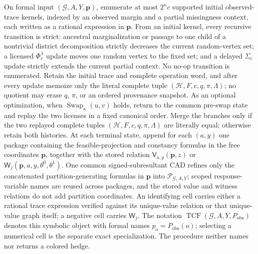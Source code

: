 On formal input \((\mathcal G,A,Y,\mathbf p)\), enumerate at most \(2^n c\) supported initial observed-trace kernels, indexed by an observed margin and a partial missingness context, each written as a rational expression in \(\mathbf p\). From an initial kernel, every recursive transition is strict: ancestral marginalization or passage to one child of a nontrivial district decomposition strictly decreases the current random-vertex set; a licensed \(\Phi_v^{\lambda}\) update moves one random vertex to the fixed set; and a delayed \(\Sigma_c\) update strictly extends the current partial context. No no-op transition is enumerated. Retain the initial trace and complete operation word, and after every update memoize only the literal complete tuple \((\mathcal H,F,c,q,\pi,\Lambda)\); no quotient may erase \(q\), \(\pi\), or an ordered provenance snapshot. As an optional optimization, when \(\operatorname{Swap}_{\kappa}(u,v)\) holds, return to the common pre-swap state and replay the two licenses in a fixed canonical order. Merge the branches only if the two replayed complete tuples \((\mathcal H,F,c,q,\pi,\Lambda)\) are literally equal; otherwise retain both histories. At each terminal state, append for each \((a,y)\) one package containing the feasible-projection and constancy formulas in the free coordinates \(\mathbf p\), together with the stored relation \(\mathsf V_{a,y}(\mathbf p,z)\) or \(\mathsf W_j(\mathbf p,a,y,\theta^0,\theta^1)\). One common signed-subresultant CAD refines only the concatenated partition-generating formulas in \(\mathbf p\) into \(\mathscr P_{\mathcal G,A,Y}\); scoped response-variable names are reused across packages, and the stored value and witness relations do not add partition coordinates. An identifying cell carries either a rational trace expression verified against its unique-value relation or that unique-value graph itself; a negative cell carries \(\mathsf W_j\). The notation \(\operatorname{TCF}(\mathcal G,A,Y,P_{\mathrm{obs}})\) denotes this symbolic object with formal names \(p_o=P_{\mathrm{obs}}(o)\); selecting a numerical cell is the separate exact specialization. The procedure neither names nor returns a colored hedge.